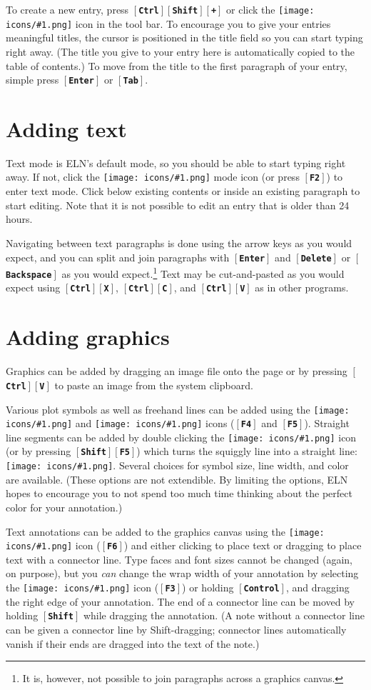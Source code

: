 \documentclass[11pt]{report}
\def\keystroke#1{$\left[\right.\!${\tt\bfseries #1}$\!\left.\right]$}
\def\key#1{\keystroke{#1}}
\def\keycombo#1#2{\keystroke{#1}\keystroke{#2}}
\def\keycontrol#1{\keycombo{Ctrl}{#1}}
\def\keyshift#1{\keycombo{Shift}{#1}}
\def\controlshift#1{\keystroke{Ctrl}\keystroke{Shift}\keystroke{#1}}
\def\icon#1{\raise-2pt\hbox{\texttt{[image: icons/\#1.png]}}}
\begin{document}
To create a new entry, press \controlshift{+} or click the
\icon{nav-plus} icon in the tool bar. To encourage you to give
your entries meaningful titles, the cursor is positioned in the title
field so you can start typing right away. (The title you give to your
entry here is automatically copied to the table of contents.) To move
from the title to the first paragraph of your entry, simple press
\key{Enter} or \key{Tab}.

\section{Adding text}

Text mode is ELN's default mode, so you should be able to start typing
right away. If not, click the \icon{type} mode icon (or press
\key{F2}) to enter text mode. Click below existing contents or inside
an existing paragraph to start editing. Note that it is not possible
to edit an entry that is older than 24 hours.

Navigating between text paragraphs is done using the arrow keys as you
would expect, and you can split and join paragraphs with \key{Enter}
and \key{Delete} or \key{Backspace} as you would expect.\footnote{It
  is, however, not possible to join paragraphs across a graphics
  canvas.} Text may be cut-and-pasted as you would expect using
\keycontrol{X}, \keycontrol{C}, and \keycontrol{V} as in other
programs.

\section{Adding graphics}

Graphics can be added by dragging an image file onto the page or by
pressing \keycontrol{V} to paste an image from the system
clipboard. 

Various plot symbols as well as freehand lines can be added using the
\icon{mark} and \icon{squiggle} icons (\key{F4} and
\key{F5}). Straight line segments can be added by double clicking the
\icon{squiggle} icon (or by pressing \keyshift{F5}) which turns the
squiggly line into a straight line: \icon{straight}. Several choices
for symbol size, line width, and color are available.  (These options
are not extendible. By limiting the options, ELN hopes to encourage
you to not spend too much time thinking about the perfect color for
your annotation.)

Text annotations can be added to the graphics canvas using the
\icon{note} icon (\key{F6}) and either clicking to place text or
dragging to place text with a connector line. Type faces and font
sizes cannot be changed (again, on purpose), but you \emph{can} change
the wrap width of your annotation by selecting the \icon{move} icon
(\key{F3}) or holding \key{Control}, and dragging the right edge of your
annotation. The end of a connector line can be moved by holding
\key{Shift} while dragging the annotation. (A note without a connector
line can be given a connector line by Shift-dragging; connector lines
automatically vanish if their ends are dragged into the text of the
note.)
\end{document}
